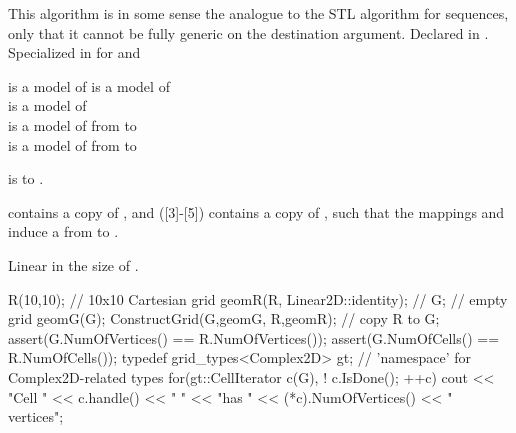 This algorithm is in some sense the analogue to the STL
 algorithm for sequences,
only that it cannot be fully generic on the destination argument.
Declared in .
\\
Specialized in 
for 
and


 is a model of 
 is a model of 
\\ 
 is a model of 
\\
 is a model of 
from  to 
\\
 is a model of 
from  to 

 is  to 
.

 contains a copy of ,
and ([3]-[5])  contains a copy of 
,
such that the mappings 
 and  induce a 
from  to .

Linear in the size of .

\begin{example}
 R(10,10);  // 10x10 Cartesian grid
  geomR(R, Linear2D::identity); // 
 G;         // empty grid
 geomG(G);
ConstructGrid(G,geomG, R,geomR); // copy R to G;
assert(G.NumOfVertices() == R.NumOfVertices());
assert(G.NumOfCells()    == R.NumOfCells());
typedef grid\_types<Complex2D> gt; // 'namespace' for Complex2D-related types 
for(gt::CellIterator c(G), ! c.IsDone(); ++c)
  cout << "Cell " << c.handle() << "  "
       << "has "  << (*c).NumOfVertices() << " vertices";
\end{example}


